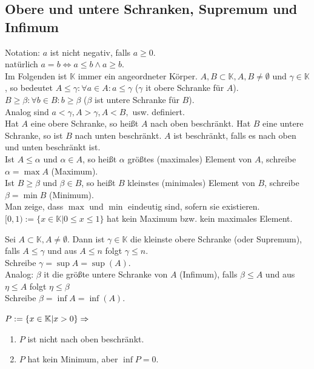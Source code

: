 \documentclass[../ana1.tex]{subfiles}
\begin{document}
\subsection{Obere und untere Schranken, Supremum und Infimum}
Notation: $a$ ist nicht negativ, falls $a\geq 0$.
\\natürlich $a=b\Leftrightarrow a\leq b \wedge a \geq b$.\\
Im Folgenden ist $\mathbb{K}$ immer ein angeordneter Körper. $A,B \subset \mathbb{K}, A,B\neq \emptyset$ und $\gamma \in \mathbb{K}$, so bedeutet $A\leq \gamma: \forall a\in A: a \leq \gamma$ ($\gamma$ it obere Schranke für $A$).\\
$B\geq \beta: \forall b\in B: b\geq \beta$ ($\beta$ ist untere Schranke für $B$).\\
Analog sind $a<\gamma, A>\gamma, A<B,$ usw. definiert.\\
Hat $A$ eine obere Schranke, so heißt $A$ nach oben beschränkt. Hat $B$ eine untere Schranke, so ist $B$ nach unten beschränkt. $A$ ist beschränkt, falls es nach oben und unten beschränkt ist.\\
Ist $A\leq \alpha$ und $\alpha\in A$, so heißt $\alpha$ größtes (maximales) Element von $A$, schreibe $\alpha = \max A$ (Maximum).\\
Ist $B\geq \beta$ und $\beta\in B$, so heißt $B$ kleinstes (minimales) Element von $B$, schreibe $\beta = \min B$ (Minimum).\\
Man zeige, dass $\max$ und $\min$ eindeutig sind, sofern sie existieren.\\
$[0,1) := \{x\in\mathbb{K}|0\leq x\leq 1\}$ hat kein Maximum bzw. kein maximales Element.
				\begin{defi}
					Sei $A\subset \mathbb{K}, A\neq \emptyset$. Dann ist $\gamma\in\mathbb{K}$ die kleinste obere Schranke (oder Supremum), falls $A\leq \gamma$ und aus $A\leq n$ folgt $\gamma \leq n$.\\
					Schreibe $\gamma = \sup A = \sup(A)$.\\
					Analog: $\beta$ it die größte untere Schranke von $A$ (Infimum), falls $\beta \leq A$ und aus $\eta \leq A$ folgt $\eta \leq \beta$\\
					Schreibe $\beta = \inf A = \inf(A)$.
				\end{defi}
				\begin{bsp}
					$P := \{x\in\mathbb{K}|x>0\}\\
						\Rightarrow$
					\begin{enumerate}
						\item $P$ ist nicht nach oben beschränkt.
						\item $P$ hat kein Minimum, aber $\inf P = 0$.
					\end{enumerate}
				\end{bsp}
\end{document}
